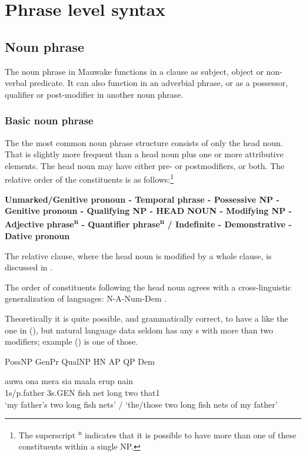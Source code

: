 
\chapter{Phrase level syntax}
\hypertarget{RefHeading21621935131865}{}
\section{Noun phrase}
\hypertarget{RefHeading21641935131865}{}
The noun phrase in Mauwake functions in a clause as subject, object or non-verbal predicate. It can also function in an adverbial phrase, or as a possessor, qualifier or post-modifier in another noun phrase.

\subsection{Basic noun phrase}
\hypertarget{RefHeading21661935131865}{}
The the most common noun phrase structure consists of only the head noun. That is slightly more frequent than a head noun plus one or more attributive elements. The head noun may have either pre- or postmodifiers, or both. The relative order of the  constituents is as follows:\footnote{The superscript \textsuperscript{n} indicates that it is possible to have more than one of these constituents within a single NP.}

{\bfseries
Unmarked/Genitive pronoun - Temporal phrase - Possessive NP - Genitive pronoun - Qualifying NP - HEAD NOUN - Modifying NP - Adjective phrase\textsuperscript{n} - Quantifier phrase\textsuperscript{n} / Indefinite - Demonstrative - Dative pronoun}

The relative clause, where the head noun is modified by a whole clause, is discussed in .

The order of  constituents following the head noun agrees with a cross-linguistic generalization of  languages:  N-A-Num-Dem \citep[112]{Dryer2007a}.

Theoretically it is quite possible, and grammatically correct, to have a  like the one in (), but natural language data seldom has any s with more than two modifiers; example () is one of those.

PossNP  GenPr  QualNP  HN  AP  QP  Dem

\ea%
\label{ex:x392}
\gll auwa  ona  mera  sia  maala  erup  nain \\
1s/p.father  3s.GEN  fish  net  long  two  that1\\
\glt `my father's two long fish nets' / `the/those two long fish nets of my father'
\z



